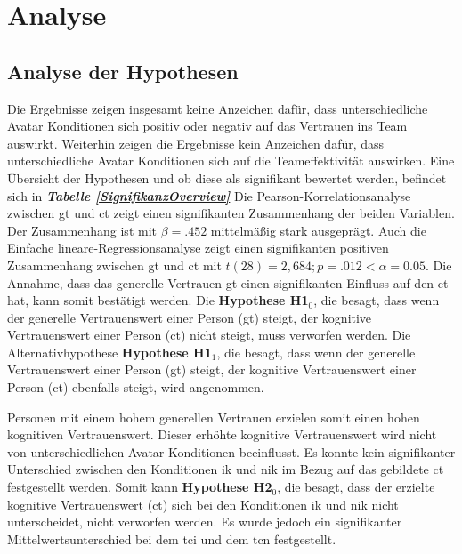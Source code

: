 \documentclass[a4paper,11pt]{article}%
\renewcommand{\\}{\vspace*{0.5\baselineskip} \newline}
\begin{document}
\clearpage
\newpage
\section{Analyse}
\subsection{Analyse der Hypothesen}
Die Ergebnisse zeigen insgesamt keine Anzeichen dafür, dass unterschiedliche Avatar Konditionen sich positiv oder negativ auf das Vertrauen ins Team auswirkt. Weiterhin zeigen die Ergebnisse kein Anzeichen dafür, dass unterschiedliche Avatar Konditionen sich auf die Teameffektivität auswirken.
Eine Übersicht der Hypothesen und ob diese als signifikant bewertet werden, befindet sich in \textbf{\textit{Tabelle \ref{SignifikanzOverview}}}
Die Pearson-Korrelationsanalyse zwischen \ac{gt} und \ac{ct} zeigt einen signifikanten Zusammenhang der beiden Variablen. Der Zusammenhang ist mit $\beta = .452$ mittelmäßig stark ausgeprägt. Auch die Einfache lineare-Regressionsanalyse zeigt einen signifikanten positiven Zusammenhang zwischen \ac{gt} und \ac{ct} mit $t(28) = 2,684; p = .012 < \alpha = 0.05$.
Die Annahme, dass das generelle Vertrauen \ac{gt} einen signifikanten Einfluss auf den \ac{ct} hat, kann somit bestätigt werden. Die \textbf{Hypothese H1$_{0}$}, die besagt, dass wenn der generelle Vertrauenswert einer Person (\ac{gt}) steigt, der kognitive Vertrauenswert einer Person (\ac{ct}) nicht steigt, muss verworfen werden. Die Alternativhypothese \textbf{Hypothese H1$_{1}$}, die besagt, dass wenn der generelle Vertrauenswert einer Person (\ac{gt}) steigt, der kognitive Vertrauenswert einer Person (\ac{ct}) ebenfalls steigt, wird angenommen.

Personen mit einem hohem generellen Vertrauen erzielen somit einen hohen kognitiven Vertrauenswert. Dieser erhöhte kognitive Vertrauenswert wird nicht von unterschiedlichen Avatar Konditionen beeinflusst. Es konnte kein signifikanter Unterschied zwischen den Konditionen \ac{ik} und \ac{nik} im Bezug auf das gebildete \ac{ct} festgestellt werden. Somit kann \textbf{Hypothese H2$_{0}$}, die besagt, dass der erzielte kognitive Vertrauenswert (\ac{ct}) sich bei den Konditionen \ac{ik} und \ac{nik} nicht unterscheidet, nicht verworfen werden.
Es wurde jedoch ein signifikanter Mittelwertsunterschied bei dem \ac{tci} und dem \ac{tcn} festgestellt.
\end{document}
